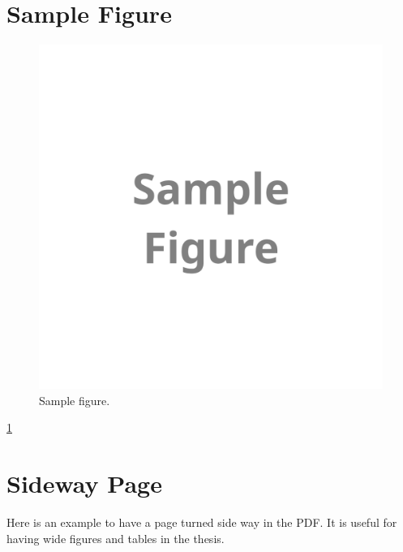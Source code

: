 
\section{Sample Figure}

\begin{figure}
\includegraphics[width=\hsize]{./figures/figure_sample.png}
\caption{Sample figure.}
\label{fig:sample}
\end{figure}

\ref{fig:sample}

\section{Sideway Page}

Here is an example to have a page turned side way in the PDF. It is useful for having wide figures and tables in the thesis.


